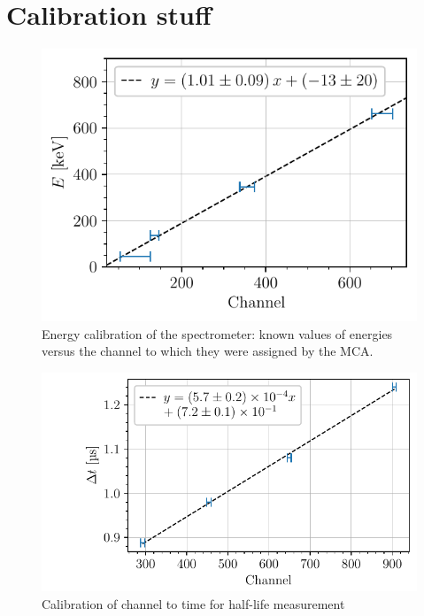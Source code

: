 \section{Calibration stuff}
\label{sec:calibration}
\begin{figure}[htbp]
    \centering
    \includegraphics[scale=1]{figures/calibration_energy.pdf}
    \caption{Energy calibration of the spectrometer: known values of energies 
    versus the channel to which they were assigned by the MCA.}
    \label{fig:calibration_energy}
\end{figure}

\begin{figure}[htbp]
    \centering
    \includegraphics[scale=1]{figures/calibration_time_interval.pdf}    
    \caption{Calibration of channel to time for half-life measurement}
    \label{fig:calibration_halflife}
\end{figure}

